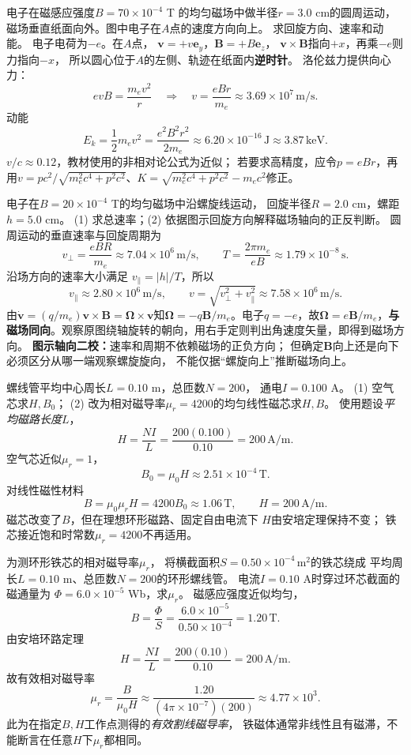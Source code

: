 \problemtext 电子在磁感应强度$B=70\times10^{-4}$ T
的均匀磁场中做半径$r=3.0$ cm的圆周运动，
磁场垂直纸面向外。图中电子在$A$点的速度方向向上。
求回旋方向、速率和动能。
\workings
电子电荷为$-e$。在$A$点，
$\bm v=+v\bm e_y$，$\bm B=+B\bm e_z$，
$\bm v\times\bm B$指向$+x$，再乘$-e$则力指向$-x$，
所以圆心位于$A$的左侧、轨迹在纸面内\textbf{逆时针}。
洛伦兹力提供向心力：
\[
evB=\frac{m_ev^2}{r}
\quad\Longrightarrow\quad
\boxed{v=\frac{eBr}{m_e}
\approx3.69\times10^7\,\mathrm{m/s}}.
\]
动能
\[
\boxed{E_k=\frac12m_ev^2
=\frac{e^2B^2r^2}{2m_e}
\approx6.20\times10^{-16}\,\mathrm J
\approx3.87\,\mathrm{keV}}.
\]
\crosscheck $v/c\approx0.12$，教材使用的非相对论公式为近似；
若要求高精度，应令$p=eBr$，再用$v=pc^2/\sqrt{m_e^2c^4+p^2c^2}$、$K=\sqrt{m_e^2c^4+p^2c^2}-m_ec^2$修正。

\problemtext 电子在$B=20\times10^{-4}$ T的均匀磁场中沿螺旋线运动，
回旋半径$R=2.0$ cm，螺距$h=5.0$ cm。
(1) 求总速率；(2) 依据图示回旋方向解释磁场轴向的正反判断。
\workings
圆周运动的垂直速率与回旋周期为
\[
v_\perp=\frac{eBR}{m_e}
\approx7.04\times10^6\,\mathrm{m/s},
\qquad
T=\frac{2\pi m_e}{eB}
\approx1.79\times10^{-8}\,\mathrm s.
\]
沿场方向的速率大小满足
$v_\parallel=|h|/T$，所以
\[
v_\parallel\approx2.80\times10^6\,\mathrm{m/s},
\qquad
\boxed{v=\sqrt{v_\perp^2+v_\parallel^2}
\approx7.58\times10^6\,\mathrm{m/s}}.
\]
由$\dot{\bm v}=(q/m_e)\bm v\times\bm B=\bm\Omega\times\bm v$知$\bm\Omega=-q\bm B/m_e$。电子$q=-e$，故$\bm\Omega=e\bm B/m_e$，\textbf{与磁场同向}。观察原图绕轴旋转的朝向，用右手定则判出角速度矢量，即得到磁场方向。
\crosscheck \textbf{图示轴向二校：}速率和周期不依赖磁场的正负方向；
但确定$\bm B$向上还是向下必须区分从哪一端观察螺旋旋向，
不能仅据“螺旋向上”推断磁场向上。

\problemtext 螺线管平均中心周长$L=0.10$ m，总匝数$N=200$，
通电$I=0.100$ A。
(1) 空气芯求$H,B_0$；
(2) 改为相对磁导率$\mu_r=4200$的均匀线性磁芯求$H,B$。
\workings
使用题设\emph{平均磁路长度}$L$，
\[
\boxed{H=\frac{NI}{L}
=\frac{200(0.100)}{0.10}
=200\,\mathrm{A/m}}.
\]
空气芯近似$\mu_r=1$，
\[
\boxed{B_0=\mu_0H\approx2.51\times10^{-4}\,\mathrm T}.
\]
对线性磁性材料
\[
\boxed{B=\mu_0\mu_rH
=4200B_0\approx1.06\,\mathrm T},\qquad
\boxed{H=200\,\mathrm{A/m}}.
\]
\crosscheck 磁芯改变了$B$，但在理想环形磁路、固定自由电流下
$H$由安培定理保持不变；
铁芯接近饱和时常数$\mu_r=4200$不再适用。

\problemtext 为测环形铁芯的相对磁导率$\mu_r$，
将横截面积$S=0.50\times10^{-4}\,\mathrm{m^2}$的铁芯绕成
平均周长$L=0.10$ m、总匝数$N=200$的环形螺线管。
电流$I=0.10$ A时穿过环芯截面的磁通量为
$\Phi=6.0\times10^{-5}$ Wb，求$\mu_r$。
\workings
磁感应强度近似均匀，
\[
\boxed{B=\frac{\Phi}{S}
=\frac{6.0\times10^{-5}}{0.50\times10^{-4}}
=1.20\,\mathrm T}.
\]
由安培环路定理
\[
\boxed{H=\frac{NI}{L}
=\frac{200(0.10)}{0.10}
=200\,\mathrm{A/m}}.
\]
故有效相对磁导率
\[
\boxed{\mu_r=\frac{B}{\mu_0H}
\approx\frac{1.20}{(4\pi\times10^{-7})(200)}
\approx4.77\times10^3}.
\]
\crosscheck 此为在指定$B,H$工作点测得的\emph{有效割线磁导率}，
铁磁体通常非线性且有磁滞，不能断言在任意$H$下$\mu_r$都相同。
